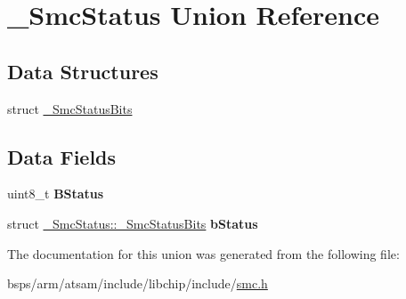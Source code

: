 \hypertarget{union__SmcStatus}{}\section{\+\_\+\+Smc\+Status Union Reference}
\label{union__SmcStatus}
\subsection*{Data Structures}
\begin{DoxyCompactItemize}
\item 
struct \mbox{\hyperlink{struct__SmcStatus_1_1__SmcStatusBits}{\+\_\+\+Smc\+Status\+Bits}}
\end{DoxyCompactItemize}
\subsection*{Data Fields}
\begin{DoxyCompactItemize}
\item 
\mbox{\label{union__SmcStatus_a34e11de40d856c61a3af614d87713231}} 
uint8\+\_\+t {\bfseries B\+Status}
\item 
\mbox{\label{union__SmcStatus_a06b95687f63fba8a25d8d62c4546d2a3}} 
struct \mbox{\hyperlink{struct__SmcStatus_1_1__SmcStatusBits}{\+\_\+\+Smc\+Status\+::\+\_\+\+Smc\+Status\+Bits}} {\bfseries b\+Status}
\end{DoxyCompactItemize}


The documentation for this union was generated from the following file\+:\begin{DoxyCompactItemize}
\item 
bsps/arm/atsam/include/libchip/include/\mbox{\hyperlink{atsam_2include_2libchip_2include_2smc_8h}{smc.\+h}}\end{DoxyCompactItemize}
